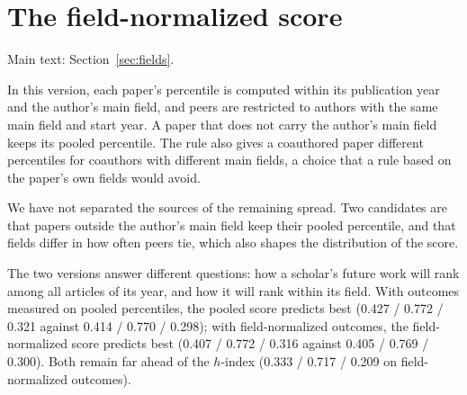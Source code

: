\documentclass[11pt]{article}
\begin{document}
\section{The field-normalized score}
\label{supp:fields}
\noindent Main text: Section~\ref{sec:fields}.\par\nopagebreak

In this version, each paper's percentile is computed within its publication year and the
author's main field, and peers are restricted to authors with the same main field and start year. A paper that does
not carry the author's main field keeps its pooled percentile. The rule also gives a coauthored paper different
percentiles for coauthors with different main fields, a choice that a rule based on the paper's own fields would
avoid.

We have not separated the sources
of the remaining spread. Two candidates are that papers outside the author's main field keep their pooled percentile,
and that fields differ in how often peers tie, which also shapes the distribution of the score.

The two versions answer different questions: how a scholar's future work will rank among all articles of its year,
and how it will rank within its field. With outcomes measured on pooled percentiles, the pooled score predicts
best (0.427 / 0.772 / 0.321 against 0.414 / 0.770 / 0.298); with field-normalized outcomes, the field-normalized score
predicts best (0.407 / 0.772 / 0.316 against 0.405 / 0.769 / 0.300). Both remain far ahead of the $h$-index
(0.333 / 0.717 / 0.209 on field-normalized outcomes).



\end{document}
